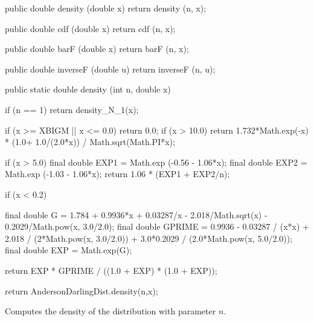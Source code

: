 \begin{code}\begin{hide}

   public double density (double x) {
      return density (n, x);
   }

   public double cdf (double x) {
      return cdf (n, x);
   }

   public double barF (double x) {
      return barF (n, x);
   }

   public double inverseF (double u) {
      return inverseF (n, u);
   }\end{hide}

   public static double density (int n, double x)\begin{hide} {
      if (n == 1) 
         return density_N_1(x);

      if (x >= XBIGM || x <= 0.0)
         return 0.0;
      if (x > 10.0) 
         return 1.732*Math.exp(-x) * (1.0+ 1.0/(2.0*x)) / Math.sqrt(Math.PI*x);

      if (x > 5.0) {
         final double EXP1 = Math.exp (-0.56 - 1.06*x);
         final double EXP2 = Math.exp (-1.03 - 1.06*x);
         return 1.06 * (EXP1 + EXP2/n);
      }

      if (x < 0.2) {
         final double G = 1.784 + 0.9936*x + 0.03287/x - 2.018/Math.sqrt(x) 
                        - 0.2029/Math.pow(x, 3.0/2.0);
         final double GPRIME = 0.9936 - 0.03287 / (x*x) 
                        + 2.018 / (2*Math.pow(x, 3.0/2.0)) 
                        + 3.0*0.2029 / (2.0*Math.pow(x, 5.0/2.0));
         final double EXP = Math.exp(G);

         return EXP * GPRIME / ((1.0 + EXP) * (1.0 + EXP));
      }
      return AndersonDarlingDist.density(n,x);
   }\end{hide}
\end{code}
\begin{tabb} Computes the density of the \ad{} distribution with parameter $n$.
\end{tabb}
